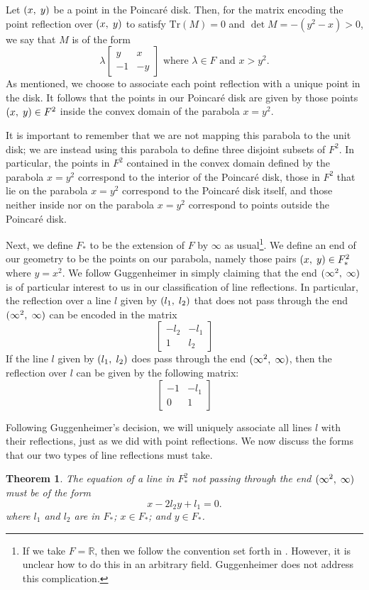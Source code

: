 \documentclass[12pt]{article}
\newcommand{\R}{\mathbb{R}}
\newcommand{\lftmat}[4]{\begin{bmatrix} {#1} & {#2} \\ {#3} & {#4} \end{bmatrix}}
\newcommand{\pointmat}[2]{\lftmat{{#2}}{{#1}}{-1}{-{#2}}}
\newcommand{\stanpointmat}{\pointmat{x}{y}}
\newcommand{\linenoendmat}[2]{\begin{bmatrix} -{#2} & -{#1} \\ 1 & {#2} \end{bmatrix}}
\newcommand{\stanlinenoendmat}{\linenoendmat{l_1}{l_2}}
\newcommand{\lineendmat}[2]{\begin{bmatrix} -1 & -{#1} \\ 0 & 1 \end{bmatrix}}
\newcommand{\stanlineendmat}{\lineendmat{l_1}{l_2}}
\newcommand{\ttc}{, \hspace{1mm}}
\newcommand{\poincare}{Poincar\'{e} }
\newcommand{\Tr}{\text{Tr}}
\newcommand{\specialend}{(\infty^2\ttc\infty)}
\theoremstyle{plain}
\newtheorem{theorem}{Theorem}[section]
\theoremstyle{definition}
\begin{document}
Let $(x \ttc y)$ be a point in the \poincare disk. Then, for the matrix encoding the point reflection over $(x \ttc y)$ to satisfy $\Tr(M) = 0$ and $\det M = -(y^2 - x) > 0$, we say that $M$ is of the form
\begin{equation} 
	\lambda \stanpointmat \text{ where } \lambda \in F \text{ and } x > y^2. 
\end{equation}	
As mentioned, we choose to associate each point reflection with a unique point in the disk. It follows that the points in our \poincare disk are given by those points $(x \ttc y) \in F^2$ inside the convex domain of the parabola $x = y^2$.

It is important to remember that we are not mapping this parabola to the unit disk; we are instead using this parabola to define three disjoint subsets of $F^2$. In particular, the points in $F^2$ contained in the convex domain defined by the parabola $x=y^2$ correspond to the interior of the \poincare disk, those in $F^2$ that lie on the parabola $x=y^2$ correspond to the \poincare disk itself, and those neither inside nor on the parabola $x=y^2$ correspond to points outside the \poincare disk.

Next, we define $F_*$ to be the extension of $F$ by $\infty$ as usual\footnote{If we take $F = \R$, then we follow the convention set forth in \cite{shuman_infinity}. However, it is unclear how to do this in an arbitrary field. Guggenheimer does not address this complication.}. We define an end of our geometry to be the points on our parabola, namely those pairs $(x \ttc y) \in F_*^2$ where $y = x^2$. We follow Guggenheimer in simply claiming that the end $\specialend$ is of particular interest to us in our classification of line reflections. In particular, the reflection over a line $l$ given by $(l_1\ttc l_2)$ that does not pass through the end $\specialend$ can be encoded in the matrix
\[\stanlinenoendmat\]
If the line $l$ given by $(l_1\ttc l_2)$ does pass through the end $\specialend$, then the reflection over $l$ can be given by the following matrix:
\[
	\stanlineendmat
\]

Following Guggenheimer's decision, we will uniquely associate all lines $l$ with their reflections, just as we did with point reflections. We now discuss the forms that our two types of line reflections must take.

\begin{theorem}The equation of a line in $F_*^2$ not passing through the end $\specialend$ must be of the form \begin{equation}
	x - 2l_2y + l_1  = 0.
\end{equation} 
where $l_1$ and $l_2$ are in $F_*$; $x \in F_*$; and $y \in F_*$.
\end{theorem}
\end{document}

